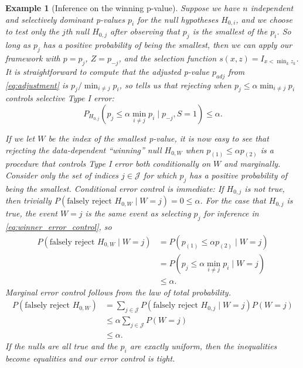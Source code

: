 \documentclass{article}
\newtheorem{example}{Example}
\begin{document}
\begin{example}[Inference on the winning p-value]
    \label{exm:winner} Suppose we have $n$ independent and selectively dominant p-values $p_i$ for the null hypotheses $H_{0, i}$, and we choose to test only the $j$th null $H_{0, j}$ after observing that $p_j$ is the smallest of the $p_i$. So long as $p_j$ has a positive probability of being the smallest, then we can apply our framework with $p =p_j$, $Z = p_{-j}$, and the selection function $s(x, z) = I_{x < \min_{k} z_k}$. It is straightforward to compute that the adjusted p-value $p_{adj}$ from \eqref{eq:adjustment} is $p_j/\min_{i \neq j} p_i$, so  tells us that rejecting when $p_j \leq \alpha \min_{i \neq j} p_i$ controls selective Type I error:
    \begin{equation}
        \label{eq:winner_error_control}
        P_{H_{0, j}}(p_j \leq \alpha \min_{i \neq j} p_i \mid  p_{-j}, S = 1) \leq \alpha.
    \end{equation} 

    If we let $W$ be the index of the smallest p-value, it is now easy to see that rejecting the data-dependent ``winning'' null $H_{0, W}$ when $p_{(1)} \leq \alpha p_{(2)}$ is a procedure that controls Type I error both conditionally on $W$ and marginally. Consider only the set of indices $j \in \mathcal{J}$ for which $p_j$ has a positive probability of being the smallest. Conditional error control is immediate: If $H_{0, j}$ is not true, then trivially $P(\text{falsely reject } H_{0, W} \mid W = j) = 0 \leq \alpha$. For the case that $H_{0, j}$ is true, the event $W=j$ is the same event as selecting $p_j$ for inference in \eqref{eq:winner_error_control}, so 
    \begin{align*}
        P(\text{falsely reject } H_{0, W} \mid W = j) &= P(p_{(1)} \leq \alpha p_{(2)} \mid W = j)\\
        &= P(p_j \leq \alpha \min_{i \neq j} p_i \mid W = j)\\
        &\leq \alpha.
    \end{align*}
     Marginal error control follows from the law of total probability. 
    \begin{align*}
        P(\text{falsely reject } H_{0, W}) &= \sum_{j \in \mathcal{J}} P(\text{falsely reject } H_{0, j} \mid W = j)P(W=j) \\
                                          &\leq \alpha \sum_{j \in \mathcal{J}} P(W=j)\\
                                          &\leq \alpha. 
    \end{align*}
    If the nulls are all true and the $p_i$ are exactly uniform, then the inequalities become equalities and our error control is tight. 
\end{example}
\end{document}
